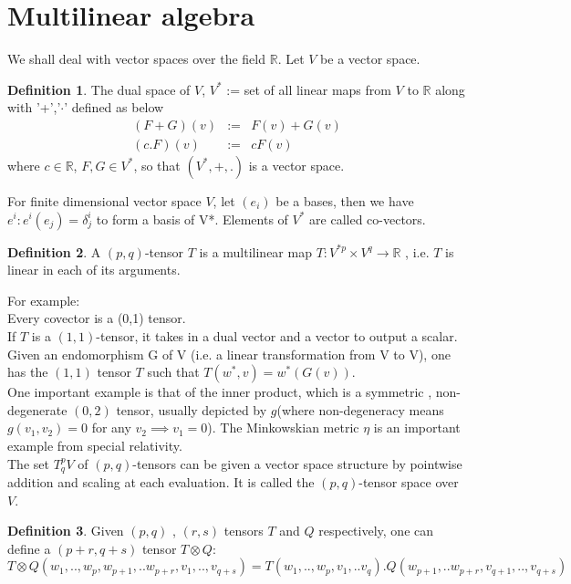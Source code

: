 \documentclass[a4paper]{report}
\theoremstyle{definition}
\newtheorem{definition}{Definition}[section]
\theoremstyle{remark}
\begin{document}
	\section{Multilinear algebra}
		We shall deal with vector spaces over the field $\mathbb{R}$.
		Let $V$ be a vector space.
		\begin{definition}
			The dual space of $V$, $V^*$ := set of all linear maps from $V$ to $\mathbb{R}$ along with '+','$\cdot$' defined as below
			\begin{eqnarray*}
				(F+G)(v) &:=&F(v) + G(v) \\ (c.F)(v) &:=&  cF(v) 
			\end{eqnarray*}
			where $c \in \mathbb{R}$, $F,G \in V^*$, so that $(V^*,+,.)$ is a vector space.
		\end{definition}
		For finite dimensional vector space $V$, let $(e_i)$ be a bases, then we have $e^i: e^i(e_j) = \delta^i_j$  to form a basis of V*. Elements of $V^*$ are called co-vectors.
		\begin{definition}
			A $(p,q)$-tensor $T$ is a multilinear map $T:V^{*p} \times V^q \to \mathbb{R}$ , i.e. $T$ is linear in each of its arguments.
		\end{definition}
		For example:\\
		Every covector is a (0,1) tensor. \\
		If $T$ is a $(1,1)$-tensor, it takes in a dual vector and a  vector to output a scalar. Given an endomorphism G of V (i.e. a linear transformation from V to V), one has the $(1,1)$ tensor $T$ such that $T(w^*,v) = w^*(G(v))$. \\
		One important example is that of the inner product, which is a symmetric , non-degenerate $(0,2)$ tensor, usually depicted by $g$(where non-degeneracy means $g(v_1,v_2) = 0$ for any $v_2 \implies v_1=0$). The Minkowskian metric $\eta$ is an important example from special relativity. \\
		The set $T^{ p}_qV$ of $(p,q)$-tensors can be given a vector space structure by pointwise addition and scaling at each evaluation. It is called the $(p,q)$-tensor space over $V$.
		\begin{definition}
			Given $(p,q)$ , $(r,s)$ tensors $T$ and $Q$ respectively, one can define a $(p+r,q+s)$ tensor $T\otimes Q$:
		\begin{equation*}
		T\otimes Q(w_1,..,w_p,w_{p+1},..w_{p+r},v_1,..,v_{q+s})=T(w_1,..,w_p,v_1,..v_q).Q(w_{p+1},..w_{p+r},v_{q+1},..,v_{q+s})\end{equation*}\end{definition}
\end{document}

